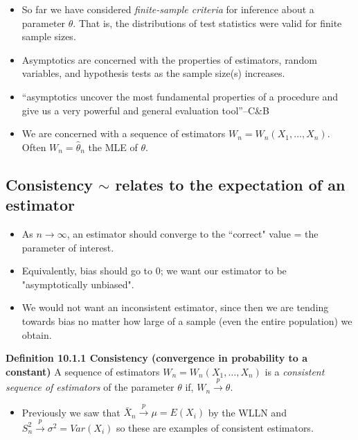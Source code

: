 \documentclass[11pt,]{article}
\providecommand{\tightlist}{%
  \setlength{\itemsep}{0pt}\setlength{\parskip}{0pt}}
\newcommand{\Xndots}{X_1, \ldots, X_n}
\def\thetahat{{\widehat\theta}}
\def\Xbar{\bar{ X}}
\begin{document}
\begin{itemize}
\tightlist
\item
  So far we have considered \emph{finite-sample criteria} for inference
  about a parameter \(\theta\). That is, the distributions of test
  statistics were valid for finite sample sizes.
\item
  Asymptotics are concerned with the properties of estimators, random
  variables, and hypothesis tests as the sample size(s) increases.
\item
  ``asymptotics uncover the most fundamental properties of a procedure
  and give us a very powerful and general evaluation tool''--C\&B
\item
  We are concerned with a sequence of estimators
  \(W_n = W_n(X_1,\ldots,X_n)\). Often \(W_n = \thetahat_n\) the MLE of
  \(\theta\).
\end{itemize}

\hypertarget{consistency-sim-relates-to-the-expectation-of-an-estimator}{%
\subsection{\texorpdfstring{Consistency \(\sim\) relates to the
expectation of an
estimator}{Consistency \textbackslash{}sim relates to the expectation of an estimator}}\label{consistency-sim-relates-to-the-expectation-of-an-estimator}}

\begin{itemize}
\item As $n\to\infty$, an estimator should converge to the ``correct" value = the parameter of interest.
\item Equivalently, bias should go to 0; we want our estimator to be "asymptotically unbiased".
\item We would not want an inconsistent estimator, since then we are tending towards bias no matter how large of a sample (even the entire population) we obtain.
\end{itemize}

\textbf{Definition 10.1.1 Consistency (convergence in probability to a
constant)} A sequence of estimators \(W_n = W_n(\Xndots)\) is a
\emph{consistent sequence of estimators} of the parameter \(\theta\) if,
\(W_n \xrightarrow{p} \theta\).

\begin{itemize}
\tightlist
\item
  Previously we saw that \(\Xbar_n \xrightarrow{p} \mu = E(X_i)\) by the
  WLLN and \(S^2_n \xrightarrow{p} \sigma^2 = Var(X_i)\) so these are
  examples of consistent estimators.
\end{itemize}
\end{document}

